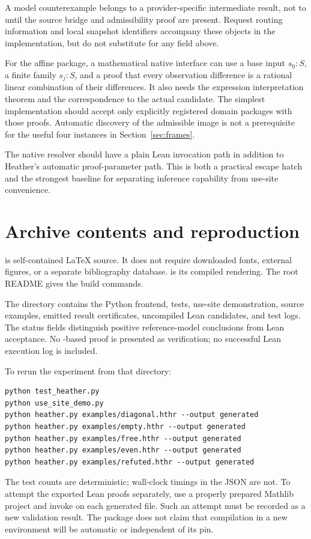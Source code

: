 \documentclass[11pt,letterpaper]{article}
\newcommand{\code}[1]{\texttt{\detokenize{#1}}}
\theoremstyle{definition}\newtheorem{definition}[theorem]{Definition}
\theoremstyle{remark}\newtheorem{remark}[theorem]{Remark}
\begin{document}
A model counterexample belongs to a provider-specific intermediate result,
not to \code{refuted} until the source bridge and admissibility proof are
present. Request routing information and local snapshot identifiers accompany
these objects in the implementation, but do not substitute for any field above.

For the affine package, a mathematical native interface can use a base input
$s_0:S$, a finite family $s_j:S$, and a proof that every observation difference
is a rational linear combination of their differences. It also needs the
expression interpretation theorem and the correspondence to the actual
candidate. The simplest implementation should accept only explicitly
registered domain packages with those proofs. Automatic discovery of the
admissible image is not a prerequisite for the useful four instances in
Section~\ref{sec:frames}.

The native resolver should have a plain Lean invocation path in addition to
Heather's automatic proof-parameter path. This is both a practical escape hatch
and the strongest baseline for separating inference capability from use-site
convenience.

\clearpage
\section{Archive contents and reproduction}\label{app:reproduce}

 is self-contained LaTeX source. It does not require downloaded
fonts, external figures, or a separate bibliography database.
 is its compiled rendering. The root README gives the build
commands.

The  directory contains the Python frontend, tests, use-site
demonstration, source examples, emitted result certificates, uncompiled Lean
candidates, and test logs. The status fields distinguish positive reference-model
conclusions from Lean acceptance. No \code{sorry}-based proof is presented as
verification; no successful Lean execution log is included.

To rerun the experiment from that directory:
\par\noindent\begin{minipage}{\linewidth}
\begin{lstlisting}
python test_heather.py
python use_site_demo.py
python heather.py examples/diagonal.hthr --output generated
python heather.py examples/empty.hthr --output generated
python heather.py examples/free.hthr --output generated
python heather.py examples/even.hthr --output generated
python heather.py examples/refuted.hthr --output generated
\end{lstlisting}
\end{minipage}\par
The test counts are deterministic; wall-clock timings in the JSON are not.
To attempt the exported Lean proofs separately, use a properly prepared Mathlib
project and invoke \code{lake env lean} on each generated file. Such an attempt
must be recorded as a new validation result. The package does not claim that
compilation in a new environment will be automatic or independent of its pin.
\end{document}
